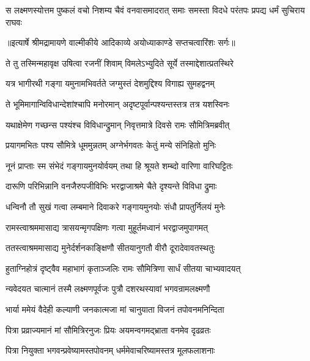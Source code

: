 \fourlineindentedshloka
{स लक्ष्मणस्योत्तम पुष्कलं वचो}
{ निशम्य चैवं वनवासमादरात्}
{समाः समस्ता विदधे परंतपः}
{ प्रपद्य धर्मं सुचिराय राघवः} %


{॥इत्यार्षे श्रीमद्रामायणे वाल्मीकीये आदिकाव्ये अयोध्याकाण्डे सप्तचत्वारिंशः सर्गः॥}


\twolineshloka
{ते तु तस्मिन्महावृक्ष उषित्वा रजनीं शिवाम्}
{विमलेऽभ्युदिते सूर्ये तस्माद्देशात्प्रतस्थिरे} %

\twolineshloka
{यत्र भागीरथी गङ्गा यमुनामभिवर्तते}
{जग्मुस्तं देशमुद्दिश्य विगाह्य सुमहद्वनम्} %

\twolineshloka
{ते भूमिमागान्विविधान्देशांश्चापि मनोरमान्}
{अदृष्टपूर्वान्पश्यन्तस्तत्र तत्र यशस्विनः} %

\twolineshloka
{यथाक्षेमेण गच्छन्स पश्यंश्च विविधान्द्रुमान्}
{निवृत्तमात्रे दिवसे रामः सौमित्रिमब्रवीत्} %

\twolineshloka
{प्रयागमभितः पश्य सौमित्रे धूममुन्नतम्}
{अग्नेर्भगवतः केतुं मन्ये संनिहितो मुनिः} %

\twolineshloka
{नूनं प्राप्ताः स्म संभेदं गङ्गायमुनयोर्वयम्}
{तथा हि श्रूयते शम्ब्दो वारिणा वारिघट्टितः} %

\twolineshloka
{दारूणि परिभिन्नानि वनजैरुपजीविभिः}
{भरद्वाजाश्रमे चैते दृश्यन्ते विविधा द्रुमाः} %

\twolineshloka
{धन्विनौ तौ सुखं गत्वा लम्बमाने दिवाकरे}
{गङ्गायमुनयोः संधौ प्रापतुर्निलयं मुनेः} %

\twolineshloka
{रामस्त्वाश्रममासाद्य त्रासयन्मृगपक्षिणः}
{गत्वा मुहूर्तमध्वानं भरद्वाजमुपागमत्} %

\twolineshloka
{ततस्त्वाश्रममासाद्य मुनेर्दर्शनकाङ्क्षिणौ}
{सीतयानुगतौ वीरौ दूरादेवावतस्थतुः} %

\twolineshloka
{हुताग्निहोत्रं दृष्ट्वैव महाभागं कृताञ्जलिः}
{रामः सौमित्रिणा सार्धं सीतया चाभ्यवादयत्} %

\twolineshloka
{न्यवेदयत चात्मानं तस्मै लक्ष्मणपूर्वजः}
{पुत्रौ दशरथस्यावां भगवन्रामलक्ष्मणौ} %

\twolineshloka
{भार्या ममेयं वैदेही कल्याणी जनकात्मजा}
{मां चानुयाता विजनं तपोवनमनिन्दिता} %

\twolineshloka
{पित्रा प्रव्राज्यमानं मां सौमित्रिरनुजः प्रियः}
{अयमन्वगमद्भ्राता वनमेव दृढव्रतः} %

\twolineshloka
{पित्रा नियुक्ता भगवन्प्रवेष्यामस्तपोवनम्}
{धर्ममेवाचरिष्यामस्तत्र मूलफलाशनाः} %


